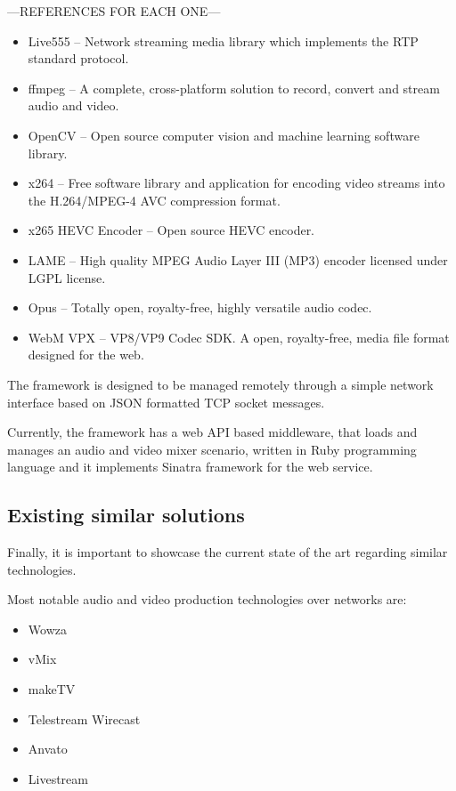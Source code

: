 ---REFERENCES FOR EACH ONE---
\begin{itemize}
\item Live555 – Network streaming media library which implements the RTP standard protocol.
\item ffmpeg – A complete, cross-platform solution to record, convert and stream audio and video.
\item OpenCV – Open source computer vision and machine learning software library.
\item x264 – Free software library and application for encoding video streams into the H.264/MPEG-4 AVC compression format.
\item x265 HEVC Encoder – Open source HEVC encoder.
\item LAME – High quality MPEG Audio Layer III (MP3) encoder licensed under LGPL license.
\item Opus – Totally open, royalty-free, highly versatile audio codec.
\item WebM VPX – VP8/VP9 Codec SDK. A open, royalty-free, media file format designed for the web.
\end{itemize}
 
The framework is designed to be managed remotely through a simple network interface based on JSON formatted TCP socket messages. 

Currently, the framework has a web API based middleware, that loads and manages an audio and video mixer scenario, written in Ruby programming language and it implements Sinatra framework for the web service.

\subsection{Existing similar solutions}\label{SOA:similarSolutions}

Finally, it is important to showcase the current state of the art regarding similar technologies.

Most notable audio and video production technologies over networks are:

\begin{itemize}
\item Wowza \hfill


\item vMix \hfill


\item makeTV \hfill


\item Telestream Wirecast \hfill


\item Anvato \hfill


\item Livestream \hfill


\end{itemize}

